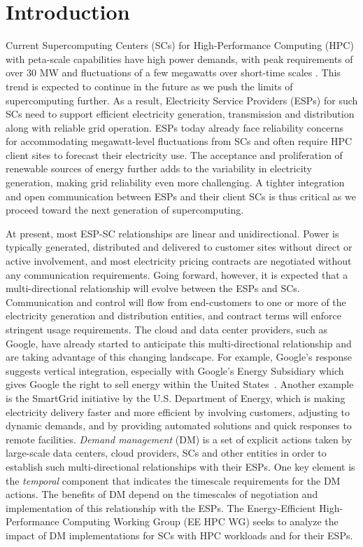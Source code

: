 \section{Introduction}
\label{intro}

Current Supercomputing Centers (SCs) for High-Performance Computing (HPC) with peta-scale capabilities have high power demands, with peak requirements of over 30 MW and fluctuations of a few megawatts over short-time scales \cite{BatesESP}. This trend is expected to continue in the future as we push the limits of supercomputing further. As a result, Electricity Service Providers (ESPs) for such SCs need to support efficient electricity generation, transmission and distribution along with reliable grid operation. ESPs today already face reliability concerns for accommodating megawatt-level fluctuations from SCs and often require HPC client sites to forecast their electricity use. The acceptance and proliferation of renewable sources of energy further adds to the variability in electricity generation, making grid reliability even more challenging. A tighter integration and open communication between ESPs and their client SCs is thus critical as we proceed toward the next generation of supercomputing. 

At present, most ESP-SC relationships are linear and unidirectional. Power is typically generated, distributed and delivered to customer sites without direct or active involvement, and most electricity pricing contracts are negotiated without any communication requirements. Going forward, however, it is expected that a multi-directional relationship will evolve between the ESPs and SCs.  Communication and control will flow from end-customers to one or more of the electricity generation and distribution entities, and contract terms will enforce stringent usage requirements. The cloud and data center providers, such as Google, have already started to anticipate this multi-directional relationship and are taking advantage of this changing landscape.  For example, Google's response suggests vertical integration, especially with Google's Energy Subsidiary which gives Google the right to sell energy within the United States~\cite{GoogleAdv}. Another example is the SmartGrid initiative \cite{SmartGrid} by the U.S. Department of Energy, which is making electricity delivery faster and more efficient by involving customers, adjusting to dynamic demands, and by providing automated solutions and quick responses to remote facilities. \emph{Demand management} (DM) is a set of explicit actions taken by large-scale data centers, cloud providers, SCs and other entities in order to establish such multi-directional relationships with their ESPs. One key element is the \emph{temporal} component that indicates the timescale requirements for the DM actions. The benefits of DM depend on the timescales of negotiation and implementation of this relationship with the ESPs. The Energy-Efficient High-Performance Computing Working Group (EE HPC WG) seeks to analyze the impact of DM implementations for SCs with HPC workloads and for their ESPs. 

